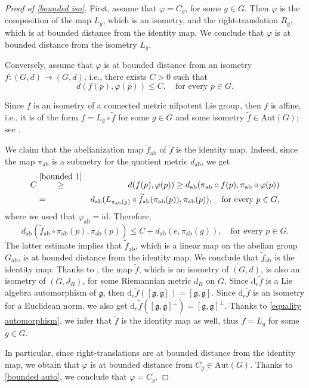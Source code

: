 \documentclass[a4paper,11pt,reqno]{amsart}
\theoremstyle{plain}
\theoremstyle{definition}
\newcommand{\g}{\mathfrak{g}}
\newcommand{\vphi}{\varphi}
\newcommand{\id}{e}
\newcommand{\de}{\mathrm{d}}
\begin{document}
\begin{proof}[Proof of \cref{bounded iso}]
 First, assume that $\vphi=C_g$, for some $g \in G$. Then $\vphi$ is the composition of the map $L_g$, which is an isometry, and the right-translation $R_g$, which is at bounded distance from the identity map. We conclude that $\vphi$ is at bounded distance from the isometry $L_g$.

 Conversely, assume that $\vphi$ is at bounded distance from an isometry $f \colon (G,d) \to (G,d)$, i.e., there exists $C>0$ such that
 \begin{equation} \label{bounded 1}
 d(f(p),\vphi(p)) \le C, \quad \text{for every $p \in G$.}
 \end{equation}

Since $f$ is an isometry of a connected metric nilpotent Lie group, then $f$ is affine, i.e., it is of the form $f = L_g \circ \widetilde{f}$ for some $g \in G$ and some isometry $\widetilde{f} \in \mathrm{Aut}(G)$; see \cite[Theorem 1.2]{MR3646026}.

 We claim that the abelianization map $\widetilde{f}_\mathrm{ab}$ of $\widetilde{f}$ is the identity map. Indeed, since the map $\pi_\mathrm{ab}$ is a submetry for the quotient metric $d_\mathrm{ab}$, we get
 \begin{eqnarray*}
 C &\stackrel{\eqref{bounded 1}}{\ge}& d(f(p),\vphi(p)) \ge d_\mathrm{ab}(\pi_\mathrm{ab} \circ f (p),\pi_\mathrm{ab} \circ \vphi (p)) \\ &=& d_\mathrm{ab}(L_{\pi_\mathrm{ab}(g)} \circ \widetilde{f}_\mathrm{ab}(\pi_\mathrm{ab} (p)), \pi_\mathrm{ab} (p) ), \quad \text{for every $p \in G$,}
 \end{eqnarray*}
 where we used that $\vphi_\mathrm{ab}=\mathrm{id}$. Therefore,
 \begin{equation*}
 d_\mathrm{ab}(\widetilde{f}_\mathrm{ab} \circ \pi_\mathrm{ab} (p), \pi_\mathrm{ab} (p)) \le C + d_\mathrm{ab}(\id,\pi_\mathrm{ab}(g)), \quad \text{for every $p \in G$.}
 \end{equation*}
 The latter estimate implies that $\widetilde{f}_\mathrm{ab}$, which is a linear map on the abelian group $G_\mathrm{ab}$, is at bounded distance from the identity map. We conclude that $\widetilde{f}_\mathrm{ab}$ is the identity map. 
 Thanks to \cite[Lemma~2.5]{MR3646026}, the map $\widetilde{f}$, which is an isometry of $(G,d)$, is also an isometry of $(G,d_R)$, for some Riemannian metric $d_R$ on $G$. Since $\de_\id \widetilde{f}$ is a Lie algebra automorphism of $\g$, then $\de_\id \widetilde{f}([\g,\g])=[\g,\g]$. Since $\de_\id \widetilde{f}$ is an isometry for a Euclidean norm, we also get $\de_\id \widetilde{f}([\g,\g]^\perp)=[\g,\g]^\perp$. Thanks to \cref{equality automorphism}, we infer that $\widetilde{f}$ is the identity map as well, thus $f = L_g$ for some $g \in G$.

 In particular, since right-translations are at bounded distance from the identity map, we obtain that $\vphi$ is at bounded distance from $C_g \in \mathrm{Aut}(G)$. Thanks to \cref{bounded auto}, we conclude that $\vphi =C_g$.
 \end{proof}
 
\end{document}
